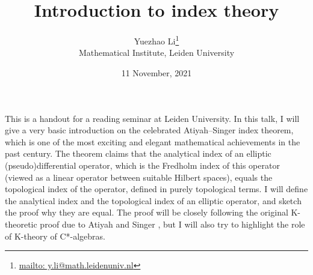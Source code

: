 \documentclass[reqno]{scrartcl}
\theoremstyle{definition}
\theoremstyle{remark}
\begin{document}
\title{Introduction to index theory}
\author{Yuezhao Li\footnote{\url{mailto: y.li@math.leidenuniv.nl}} \\ Mathematical Institute, Leiden University}
\date{11 November, 2021}
\maketitle

This is a handout for a reading seminar at Leiden University. In this talk, I will give a very basic introduction on the celebrated Atiyah--Singer index theorem, which is one of the most exciting and elegant mathematical achievements in the past century. The theorem claims that the analytical index of an elliptic (pseudo)differential operator, which is the Fredholm index of this operator (viewed as a linear operator between suitable Hilbert spaces), equals the topological index of the operator, defined in purely topological terms. I will define the analytical index and the topological index of an elliptic operator, and sketch the proof why they are equal. The proof will be closely following the original K-theoretic proof due to Atiyah and Singer \cite{atiyahsinger1}, but I will also try to highlight the role of K-theory of C*-algebras.
\end{document}
